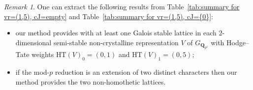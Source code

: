 \documentclass[11pt]{amsart}
\theoremstyle{definition}
\numberwithin{equation}{subsection}
\theoremstyle{plain}
\theoremstyle{plain}
\theoremstyle{plain}
\theoremstyle{plain}
\theoremstyle{plain}
\theoremstyle{plain}
\theoremstyle{plain}
\theoremstyle{plain}
\theoremstyle{plain}
\theoremstyle{plain}
\theoremstyle{plain}
\theoremstyle{plain}
\theoremstyle{definition}
\theoremstyle{definition}
\theoremstyle{definition}
\theoremstyle{remark}
\newtheorem{rema}[equation]{Remark}
\renewcommand{\(}{\textup{(}}
\renewcommand{\)}{\textup{)}}
\newcommand{\Q}{\mathbf{Q}}
\begin{document}
\begin{rema}\label{rema: 1,5} 
One can extract the following results from Table~\ref{tab:summary for vr=(1,5), cJ=empty} and Table~\ref{tab:summary for vr=(1,5), cJ={0}}:
\begin{itemize}[leftmargin=*]
\item our method provides with at least one Galois stable lattice in each $2$-dimensional semi-stable non-crystalline representation $V$ of $G_{\Q_{p^2}}$ with Hodge--Tate weights $\mathrm{HT}(V)_0=(0,1)$ and $\mathrm{HT}(V)_1=(0,5)$;
\item if the mod-$p$ reduction is an extension of two distinct characters then our method provides the two non-homothetic lattices.
\end{itemize}
\end{rema}














\smallskip
\end{document}

